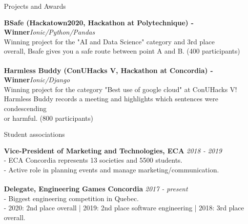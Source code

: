 \documentclass[10pt]{resume} %
\begin{document}
\begin{rSection}{Projects and Awards}

{\bf BSafe (Hackatown2020, Hackathon at Polytechnique) - Winner}\hfill {\em Ionic/Python/Pandas}\\
Winning project for the "AI and Data Science" category and 3rd place \\ overall, Bsafe gives you a safe route between point A and B. (400 participants)\\ \\
{\bf Harmless Buddy (ConUHacks V, Hackathon at Concordia) - Winner}\hfill {\em Ionic/Django}\\
Winning project for the category "Best use of google cloud" at ConUHacks V! \\Harmless Buddy records a meeting and highlights which sentences were condescending \\or harmful. (800 participants)

\end{rSection}

\begin{rSection}{Student associations}

{\bf Vice-President of Marketing and Technologies, ECA} \hfill {\em 2018 - 2019}\\
- ECA Concordia represents 13 societies and 5500 students.\\
- Active role in planning events and manage marketing/communication. \\ \\
{\bf Delegate, Engineering Games Concordia} \hfill {\em 2017 - present}\\
- Biggest engineering competition in Quebec. \\
- 2020: 2nd place overall | 2019: 2nd place software engineering | 2018: 3rd place overall.

\end{rSection}
\end{document}
